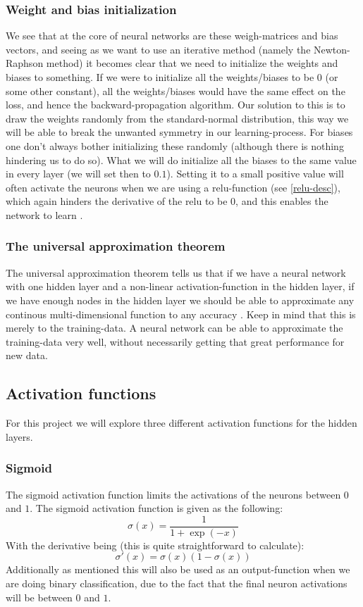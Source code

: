 \documentclass{article}
\begin{document}
\subsubsection{Weight and bias initialization}
We see that at the core of neural networks are these weigh-matrices and bias
vectors, and seeing as we want to use an iterative method (namely the
Newton-Raphson method) it becomes clear that we need to initialize the weights
and biases to something. If we were to initialize all the weights/biases to be
$0$ (or some other constant), all the weights/biases would have the same effect
on the loss, and hence the backward-propagation algorithm. Our solution to this
is to draw the weights randomly from the standard-normal distribution, this way
we will be able to break the unwanted symmetry in our learning-process. For
biases one don't always bother initializing these randomly (although there is
nothing hindering us to do so). What we will do initialize all the biases to the
same value in every layer (we will set then to $0.1$). Setting it to a small
positive value will often activate the neurons when we are using a
relu-function (see \ref{relu-desc}), which again hinders the derivative of the
relu to be $0$, and this enables the network to learn
\cite[s.~6.3.1]{goodfellow2016deep}.

\subsubsection{The universal approximation theorem}
\label{univ-approx-thm}
The universal approximation theorem tells us that if we have a neural network
with one hidden layer and a non-linear activation-function in the hidden layer,
if we have enough nodes in the hidden layer we should be able to approximate any
continous multi-dimensional function to any accuracy
\cite[s.~13.5]{lecutenotes13}. Keep in mind that this is merely to the
training-data. A neural network can be able to approximate the training-data
very well, without necessarily getting that great performance for new data.

\subsection{Activation functions}
For this project we will explore three different activation functions for the
hidden layers.
\subsubsection{Sigmoid}
The sigmoid activation function limits the activations of the neurons between
$0$ and $1$. The sigmoid activation function is given as the following:
$$\sigma(x) = \frac{1}{1 + \exp(-x)}$$
With the derivative being (this is quite straightforward to calculate):
$$\sigma'(x) = \sigma(x) (1 - \sigma(x))$$
Additionally as mentioned this will also be used as an output-function when we
are doing binary classification, due to the fact that the final neuron
activations will be between $0$ and $1$.
\end{document}
